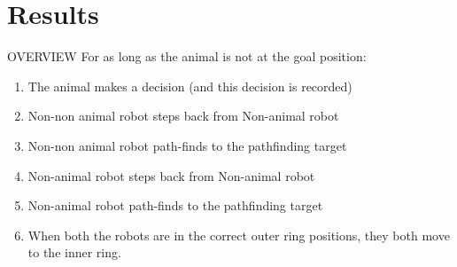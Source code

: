 \section{Results}

OVERVIEW
For as long as the animal is not at the goal position:
\begin{tcolorbox}
\begin{enumerate}
    \item The animal makes a decision (and this decision is recorded)
    \item Non-non animal robot steps back from Non-animal robot
    \item Non-non animal robot path-finds to the pathfinding target
    \item Non-animal robot steps back from Non-animal robot
    \item Non-animal robot path-finds to the pathfinding target
    \item When both the robots are in the correct outer ring positions, they both move to the inner ring.
\end{enumerate}
\end{tcolorbox}



